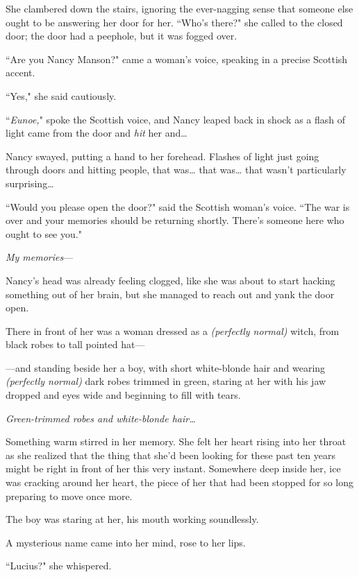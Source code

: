 She clambered down the stairs, ignoring the ever-nagging sense that someone else ought to be answering her door for her. ``Who's there?" she called to the closed door; the door had a peephole, but it was fogged over.

``Are you Nancy Manson?" came a woman's voice, speaking in a precise Scottish accent.

``Yes," she said cautiously.

``\emph{Eunoe,}" spoke the Scottish voice, and Nancy leaped back in shock as a flash of light came from the door and \emph{hit} her and{\ldots}

Nancy swayed, putting a hand to her forehead. Flashes of light just going through doors and hitting people, that was{\ldots} that was{\ldots} that wasn't particularly surprising{\ldots}

``Would you please open the door?" said the Scottish woman's voice. ``The war is over and your memories should be returning shortly. There's someone here who ought to see you."

\emph{My memories}—

Nancy's head was already feeling clogged, like she was about to start hacking something out of her brain, but she managed to reach out and yank the door open.

There in front of her was a woman dressed as a \emph{(perfectly normal)} witch, from black robes to tall pointed hat—

—and standing beside her a boy, with short white-blonde hair and wearing \emph{(perfectly normal)} dark robes trimmed in green, staring at her with his jaw dropped and eyes wide and beginning to fill with tears.

\emph{Green-trimmed robes and white-blonde hair{\ldots}}

Something warm stirred in her memory. She felt her heart rising into her throat as she realized that the thing that she'd been looking for these past ten years might be right in front of her this very instant. Somewhere deep inside her, ice was cracking around her heart, the piece of her that had been stopped for so long preparing to move once more.

The boy was staring at her, his mouth working soundlessly.

A mysterious name came into her mind, rose to her lips.

``Lucius?" she whispered.

